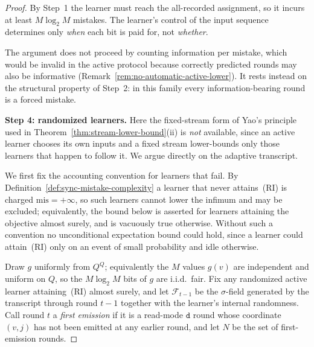 \documentclass[12pt]{article}
\theoremstyle{definition}
\newcommand{\mistk}{\mathrm{mis}}
\begin{document}
\begin{proof}
By Step~1 the learner must reach the all-recorded assignment, so it incurs at
least $M\log_2M$ mistakes.  The learner's control of the input sequence
determines only \emph{when} each bit is paid for, not \emph{whether}.

The argument does not proceed by counting information per mistake, which would
be invalid in the active protocol because correctly predicted rounds may also
be informative (Remark~\ref{rem:no-automatic-active-lower}).  It rests instead
on the structural property of Step~2: in this family every
information-bearing round is a forced mistake.

\textbf{Step 4: randomized learners.}
Here the fixed-stream form of Yao's principle used in
Theorem~\ref{thm:stream-lower-bound}(ii) is \emph{not} available, since an
active learner chooses its own inputs and a fixed stream lower-bounds only
those learners that happen to follow it.  We argue directly on the adaptive
transcript.

We first fix the accounting convention for learners that fail.  By
Definition~\ref{def:sync-mistake-complexity} a learner that never attains~(RI)
is charged $\mistk=+\infty$, so such learners cannot lower the infimum and may
be excluded; equivalently, the bound below is asserted for learners attaining
the objective almost surely, and is vacuously true otherwise.  Without such a
convention no unconditional expectation bound could hold, since a learner could
attain~(RI) only on an event of small probability and idle otherwise.

Draw $g$ uniformly from $Q^Q$; equivalently the $M$ values $g(v)$ are
independent and uniform on $Q$, so the $M\log_2M$ bits of $g$ are
i.i.d.\ fair.  Fix any randomized active learner attaining~(RI) almost surely,
and let $\mathcal F_{t-1}$ be
the $\sigma$-field generated by the transcript through round $t-1$ together
with the learner's internal randomness.  Call round $t$ a \emph{first
emission} if it is a read-mode $\mathtt d$ round whose coordinate $(v,j)$ has
not been emitted at any earlier round, and let $N$ be the set of
first-emission rounds.


\end{proof}
\end{document}
